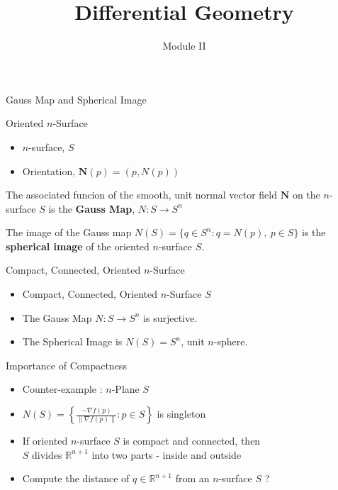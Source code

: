 \documentclass{beamer}
\title{Differential Geometry}
\author{Module II}
\institute{Chapter 6 : The Gauss Map}
\begin{document}
\begin{frame}
\maketitle
\end{frame}

\begin{frame}{Gauss Map and Spherical Image}
\begin{block}{Oriented $n$-Surface}
\begin{itemize}
	\item $n$-surface, $S$
	\item Orientation, $\mathbf{N}(p) = (p,N(p))$
\end{itemize}
\end{block}
\begin{definition}
	The associated funcion of the smooth, unit normal vector field $\mathbf{N}$ on the $n$-surface $S$ is the \textbf{Gauss Map}, $N : S \to S^n$
\end{definition}

\begin{definition}
	The image of the Gauss map $N(S) = \{ q \in S^n : q = N(p),\ p \in S \}$ is the \textbf{spherical image} of the oriented $n$-surface $S$.
\end{definition}
\end{frame}

\begin{frame}{Compact, Connected, Oriented $n$-Surface}
\begin{theorem}
\begin{itemize}
	\item Compact, Connected, Oriented $n$-Surface $S$
	\item The Gauss Map $N : S \to S^n$ is surjective.
	\item The Spherical Image is $N(S) = S^n$, unit $n$-sphere.
\end{itemize}
\end{theorem}
\begin{block}{Importance of Compactness}
\begin{itemize}
	\item Counter-example : $n$-Plane $S$
	\item $N(S) = \left\{ \frac{-\nabla f(p)}{\|\nabla f(p) \|} : p \in S \right\}$ is singleton
	\item If oriented $n$-surface $S$ is compact and connected, then\\
		$S$ divides $\mathbb{R}^{n+1}$ into two parts - inside and outside
	\item {\color{green!50!black}Compute the distance of $q \in \mathbb{R}^{n+1}$ from an $n$-surface $S$ ?}
\end{itemize}
\end{block}
\end{frame}
\end{document}
